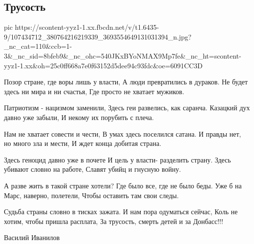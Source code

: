  
 
 
 
 

\subsection{Трусость}
\label{sec:09_07_2020.fb.1.strana}


\ifcmt
  pic https://scontent-yyz1-1.xx.fbcdn.net/v/t1.6435-9/107434712_380764216219339_3693554649131031394_n.jpg?_nc_cat=110&ccb=1-3&_nc_sid=8bfeb9&_nc_ohc=540JKxBYoNMAX9Mp7fe&_nc_ht=scontent-yyz1-1.xx&oh=25c0ff668a7e0f63152d5dee94c93fdc&oe=6091CC3D
\fi

Позор стране, где воры лишь у власти,
А люди превратились в дураков.
Не будет здесь ни мира и ни счастья,
Где просто не хватает мужиков.

Патриотизм - нацизмом заменили,
Здесь геи развелись, как саранча.
Казацкий дух давно уже забыли,
И некому их порубить с плеча.

Нам не хватает совести и чести,
В умах здесь поселился сатана.
И правды нет, но много зла и мести,
И ждет конца добитая страна.

Здесь геноцид давно уже в почете
И цель у власти- разделить страну.
Здесь убивают словно на работе,
Славят убийц и гнусную войну.

А разве жить в такой стране хотели?
Где было все, где не было беды.
Уже б на Марс, наверно, полетели,
Чтобы оставить там свои следы.

Судьба страны словно в тисках зажата.
И нам пора одуматься сейчас,
Коль не хотим, чтобы пришла расплата,
За трусость, смерть детей и за Донбасс!!!

Василий Иванилов
